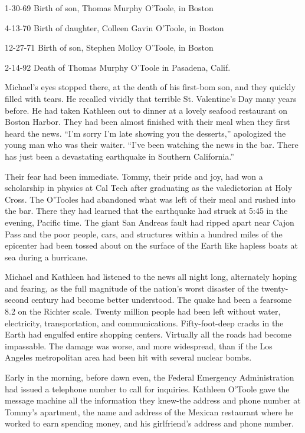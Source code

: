\documentclass[]{article}
\begin{document}
{1-30-69 Birth of son, Thomas Murphy O’Toole, in Boston

4-13-70 Birth of daughter, Colleen Gavin O’Toole, in Boston

12-27-71 Birth of son, Stephen Molloy O’Toole, in Boston

2-14-92 Death of Thomas Murphy O’Toole in Pasadena, Calif.

Michael’s eyes stopped there, at the death of his first-bom son, and they quickly filled with tears. He recalled vividly that terrible St. Valentine’s Day many years before. He had taken Kathleen out to dinner at a lovely seafood restaurant on Boston Harbor. They had been almost finished with their meal when they first heard the news. “I’m sorry I’m late showing you the desserts,” apologized the young man who was their waiter. “I’ve been watching the news in the bar. There has just been a devastating earthquake in Southern California.”

Their fear had been immediate. Tommy, their pride and joy, had won a scholarship in physics at Cal Tech after graduating as the valedictorian at Holy Cross. The O’Tooles had abandoned what was left of their meal and rushed into the bar. There they had learned that the earthquake had struck at 5:45 in the evening, Pacific time. The giant San Andreas fault had ripped apart near Cajon Pass and the poor people, cars, and structures within a hundred miles of the epicenter had been tossed about on the surface of the Earth like hapless boats at sea during a hurricane.

Michael and Kathleen had listened to the news all night long, alternately hoping and fearing, as the full magnitude of the nation’s worst disaster of the twenty-second century had become better understood. The quake had been a fearsome 8.2 on the Richter scale. Twenty million people had been left without water, electricity, transportation, and communications. Fifty-foot-deep cracks in the Earth had engulfed entire shopping centers. Virtually all the roads had become impassable. The damage was worse, and more widespread, than if the Los Angeles metropolitan area had been hit with several nuclear bombs.

Early in the morning, before dawn even, the Federal Emergency Administration had issued a telephone number to call for inquiries. Kathleen O’Toole gave the message machine all the information they knew-the address and phone number at Tommy’s apartment, the name and address of the Mexican restaurant where he worked to earn spending money, and his girlfriend’s address and phone number.

}
\end{document}
